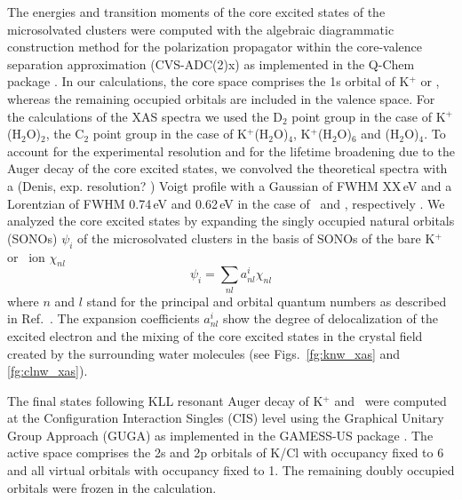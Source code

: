 The energies and transition moments of the core excited states of the microsolvated clusters were computed with the algebraic diagrammatic construction method for the polarization propagator \citep{sch82:2395} within the core-valence separation approximation \citep{bar85:867,ced80:206,ced81:1038} (CVS-ADC(2)x) as implemented in the Q-Chem package \citep{Wenzel14:1900,Wenzel14:4583,Wormit14:774,QChem2015}. In our calculations, the core space comprises the 1s orbital of K$^{+}$ or \cli, whereas the remaining occupied orbitals are included in the valence space. For the calculations of the XAS spectra we used the D$_2$ point group in the case of K$^{+}$(H$_2$O)$_2$, the C$_2$ point group in the case of K$^{+}$(H$_2$O)$_4$, K$^{+}$(H$_2$O)$_6$ and \cli(H$_2$O)$_4$. To account for the experimental resolution and for the lifetime broadening due to the Auger decay of the core excited states, we convolved the theoretical spectra with a {\color{red} (Denis, exp. resolution? ) Voigt profile with a Gaussian of FWHM XX\,eV} and a Lorentzian of FWHM 0.74\,eV and 0.62\,eV in the case of \ki~and \cli, respectively \citep{Krause79:329}. We analyzed the core excited states by expanding the singly occupied natural orbitals (SONOs) $\psi_{i}$ of the microsolvated clusters in the basis of SONOs of the bare K$^{+}$ or \cli~ion $\chi_{nl}$
%
\begin{equation}\label{eq:sono_proj}
\psi_{i} = \sum_{nl} a^{i}_{nl} \chi_{nl}
\end{equation}
%
where $n$ and $l$ stand for the principal and orbital quantum numbers as described in Ref.\ \citep{miteva16:16671}. The expansion coefficients $a^{i}_{nl}$ show the degree of delocalization of the excited electron and the mixing of the core excited states in the crystal field created by the surrounding water molecules (see Figs.\ \ref{fg:knw_xas} and \ref{fg:clnw_xas}).


The final states following KLL resonant Auger decay of K$^{+}$ and \cli~were computed at the Configuration Interaction Singles (CIS) level using the Graphical Unitary Group Approach (GUGA) as implemented in the GAMESS-US package \citep{GUGA_PhysScr_21,GUGA_JCP_70,GUS}. The active space comprises the 2s and 2p orbitals of K/Cl with occupancy fixed to 6 and all virtual orbitals with occupancy fixed to 1. The remaining doubly occupied orbitals were frozen in the calculation. \citep{mosnier16:061401}